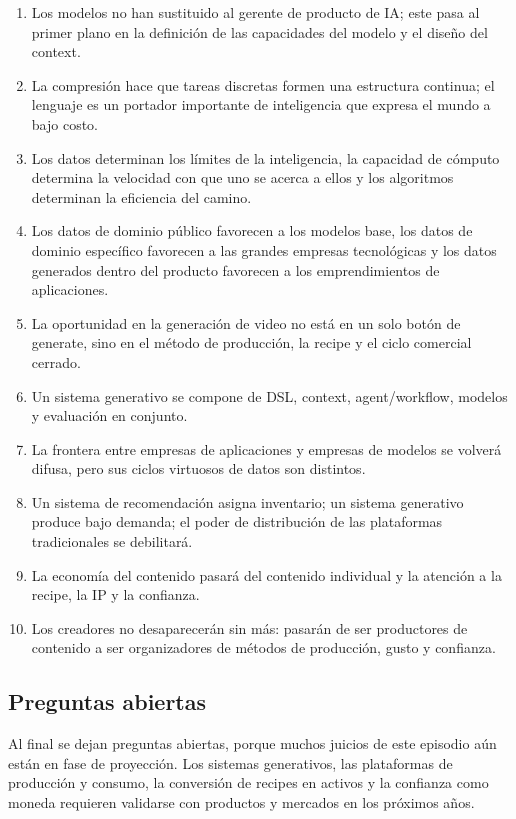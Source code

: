 \documentclass[a4paper]{article}
\begin{document}
\begin{enumerate}
\item Los modelos no han sustituido al gerente de producto de IA; este pasa al primer plano en la definición de las capacidades del modelo y el diseño del context.
\item La compresión hace que tareas discretas formen una estructura continua; el lenguaje es un portador importante de inteligencia que expresa el mundo a bajo costo.
\item Los datos determinan los límites de la inteligencia, la capacidad de cómputo determina la velocidad con que uno se acerca a ellos y los algoritmos determinan la eficiencia del camino.
\item Los datos de dominio público favorecen a los modelos base, los datos de dominio específico favorecen a las grandes empresas tecnológicas y los datos generados dentro del producto favorecen a los emprendimientos de aplicaciones.
\item La oportunidad en la generación de video no está en un solo botón de generate, sino en el método de producción, la recipe y el ciclo comercial cerrado.
\item Un sistema generativo se compone de DSL, context, agent/workflow, modelos y evaluación en conjunto.
\item La frontera entre empresas de aplicaciones y empresas de modelos se volverá difusa, pero sus ciclos virtuosos de datos son distintos.
\item Un sistema de recomendación asigna inventario; un sistema generativo produce bajo demanda; el poder de distribución de las plataformas tradicionales se debilitará.
\item La economía del contenido pasará del contenido individual y la atención a la recipe, la IP y la confianza.
\item Los creadores no desaparecerán sin más: pasarán de ser productores de contenido a ser organizadores de métodos de producción, gusto y confianza.
\end{enumerate}

\subsection{Preguntas abiertas}

Al final se dejan preguntas abiertas, porque muchos juicios de este episodio aún están en fase de proyección. Los sistemas generativos, las plataformas de producción y consumo, la conversión de recipes en activos y la confianza como moneda requieren validarse con productos y mercados en los próximos años.
\end{document}
